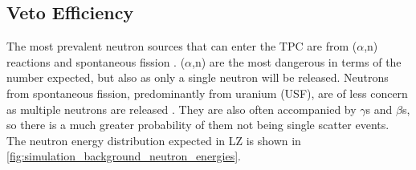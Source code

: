 \subsection{Veto Efficiency}
\label{sec:od_simulation_efficiency}
\par
The most prevalent neutron sources that can enter the TPC are from ($\alpha$,n) reactions and spontaneous fission \cite{LZ_projected_sensitivity_paper_ref}.
($\alpha$,n) are the most dangerous in terms of the number expected, but also as only a single neutron will be released.
Neutrons from spontaneous fission, predominantly from uranium (USF), are of less concern as multiple neutrons are released \cite{usf_ref}.
They are also often accompanied by $\gamma$s and $\beta$s, so there is a much greater probability of them not being single scatter events.
The neutron energy distribution expected in LZ is shown in \autoref{fig:simulation_background_neutron_energies}.



